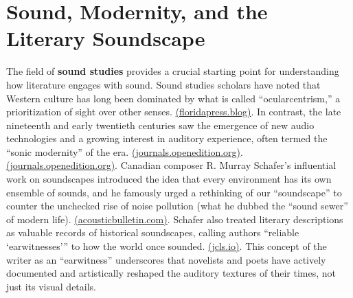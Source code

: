 \documentclass[12pt]{report}
\begin{document}
\section{Sound, Modernity, and the Literary Soundscape}
The field of \textbf{sound studies} provides a crucial starting point for understanding how literature engages with sound. Sound studies scholars have noted that Western culture has long been dominated by what is called “ocularcentrism,” a prioritization of sight over other senses. \href{https://floridapress.blog/2018/12/04/modernist-soundscapes/#:~:text=These%20writers%20challenged%20ocularcentrism%2C%20the,the%20course%20of%20contemporary%20literature}{(floridapress.blog)}. In contrast, the late nineteenth and early twentieth centuries saw the emergence of new audio technologies and a growing interest in auditory experience, often termed the “sonic modernity” of the era. \href{https://journals.openedition.org/ebc/2322#:~:text=Sam%20Halliday%2C%20Sonic%20Modernity%3A%20Representing,Literature%2C%20Culture%20and%20the%20Arts}{(journals.openedition.org)}. \href{https://journals.openedition.org/ebc/2322#:~:text=1%20Sam%20Halliday%E2%80%99s%20dashingly%20titled,%E2%80%A6%5D%20is%20not%20historically%20specific%E2%80%99}{(journals.openedition.org)}. Canadian composer R. Murray Schafer’s influential work on soundscapes introduced the idea that every environment has its own ensemble of sounds, and he famously urged a rethinking of our “soundscape” to counter the unchecked rise of noise pollution (what he dubbed the “sound sewer” of modern life). \href{https://www.acousticbulletin.com/our-visual-focus-part-2-the-eye-versus-the-ear/#:~:text=Bulletin%20www,that%20willingly%20trades%20its}{(acousticbulletin.com)}. Schafer also treated literary descriptions as valuable records of historical soundscapes, calling authors “reliable ‘earwitnesses’” to how the world once sounded. \href{https://jcls.io/article/id/3583/#:~:text=example%2C%20in%20Schafer%20,9%20%20in%20%2033}{(jcls.io)}. This concept of the writer as an “earwitness” underscores that novelists and poets have actively documented and artistically reshaped the auditory textures of their times, not just its visual details.
\end{document}
